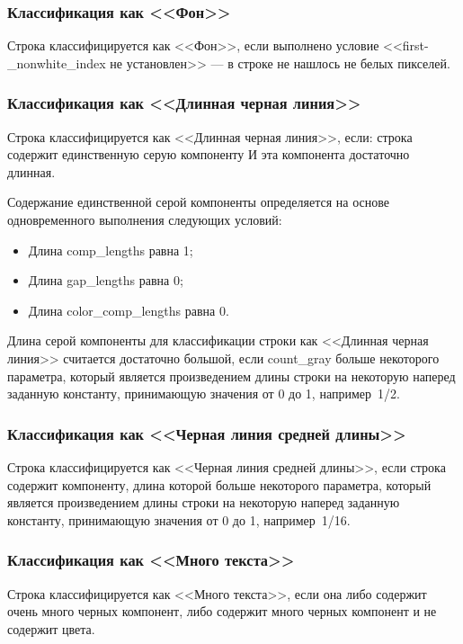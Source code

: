 \subsubsection*{Классификация как <<Фон>>}

Строка классифицируется как <<Фон>>, если выполнено условие <<first-\_nonwhite\_index не установлен>> --- в строке не нашлось не белых пикселей.

\subsubsection*{Классификация как <<Длинная черная линия>>}

Строка классифицируется как <<Длинная черная линия>>, если: строка содержит единственную серую компоненту И эта компонента достаточно длинная.

Содержание единственной серой компоненты определяется на основе одновременного выполнения следующих условий:
\begin{itemize}
    \item Длина comp\_lengths равна 1;
    \item Длина gap\_lengths равна 0;
    \item Длина color\_comp\_lengths равна 0.
\end{itemize}

Длина серой компоненты для классификации строки как <<Длинная черная линия>> считается достаточно большой, если count\_gray больше некоторого параметра, который является произведением длины строки на некоторую наперед заданную константу, принимающую значения от 0 до 1, например~1/2.

\subsubsection*{Классификация как <<Черная линия средней длины>>}

Строка классифицируется как <<Черная линия средней длины>>, если строка содержит компоненту, длина которой больше некоторого параметра, который является произведением длины строки на некоторую наперед заданную константу, принимающую значения от 0 до 1, например~1/16.

\subsubsection*{Классификация как <<Много текста>>}

Строка классифицируется как <<Много текста>>, если она либо содержит очень много черных компонент, либо содержит много черных компонент и не содержит цвета.

